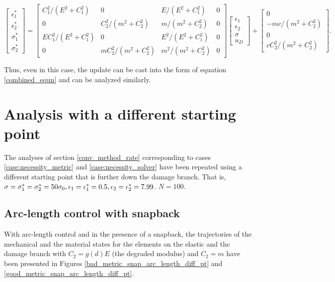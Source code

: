 \documentclass[10pt,review]{cas-sc}
\begin{document}
\begin{equation}
	\begin{bmatrix}
		\epsilon_1^* \\
		\epsilon_2^* \\
		\sigma_1^* \\
		\sigma_2^* 
	\end{bmatrix} 
	= 
	\begin{bmatrix}
		C_1^2/(E^2 + C_1^2) & 0 & E/(E^2 + C_1^2) & 0 \\
		0 & C_2^2/(m^2 + C_2^2)  & m/(m^2 + C_2^2) &0 \\
		E C_1^2/(E^2 + C_1^2) & 0 & E^2/(E^2 + C_1^2) &0\\
		0 & mC_2^2/(m^2 + C_2^2)  & m^2/(m^2 + C_2^2) &0
	\end{bmatrix} 
	\begin{bmatrix}
		\epsilon_1 \\
		\epsilon_2 \\
		\sigma \\
		u_D
	\end{bmatrix} + 
	\begin{bmatrix}
		0 \\
		-mc/(m^2+C_2^2) \\
		0 \\
		cC_2^2/(m^2+C_2^2)
	\end{bmatrix} .\label{big_update_mat_al}
\end{equation}

Thus, even in this case, the update can be cast into the form of equation \ref{combined_equn} and can be analyzed similarly.

\section{Analysis with a different starting point\label{different_starting_point}}
The analyses of section \ref{conv_method_rate} corresponding to cases \ref{case:necessity_metric} and \ref{case:necessity_solver} have been repeated using a different starting point that is further down the damage branch. That is, ${\sigma}={\sigma}_1^*={\sigma}_2^*=50 \sigma_0,{\epsilon}_1={\epsilon}_1^* =0.5,{\epsilon}_2={\epsilon}_2^* =7.99$. $N=100$.

\subsection*{Arc-length control with snapback}
With arc-length control and in the presence of a snapback, the trajectories of the mechanical and the material states for the elements on the elastic and the damage branch with $C_2 = g(d) E$ (the degraded modulus) and $C_2 = m$ have been presented in Figures \ref{bad_metric_snap_arc_length_diff_pt} and \ref{good_metric_snap_arc_length_diff_pt}.
\end{document}

